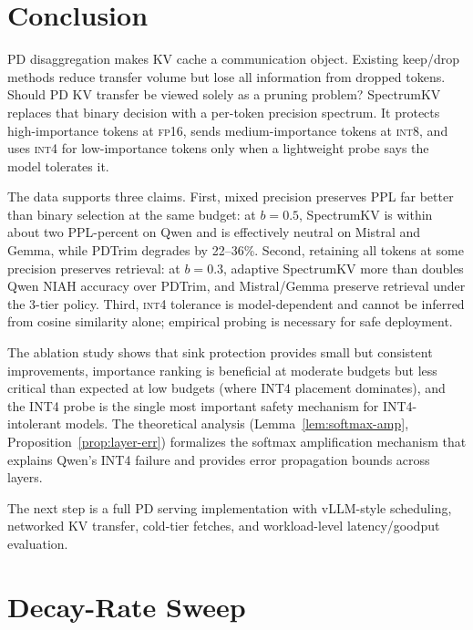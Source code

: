 \documentclass[11pt]{article}
\newcommand{\method}{SpectrumKV}
\newcommand{\niah}{NIAH}
\newcommand{\budget}{b}
\newcommand{\pct}{\%}
\newcommand{\fp}{\textsc{fp16}}
\newcommand{\intviii}{\textsc{int8}}
\newcommand{\intiv}{\textsc{int4}}
\theoremstyle{plain}
\theoremstyle{definition}
\begin{document}
\section{Conclusion}
\label{sec:conclusion}

PD disaggregation makes KV cache a communication object.  Existing keep/drop methods reduce transfer volume but lose all information from dropped tokens.  Should PD KV transfer be viewed solely as a pruning problem?  \method{} replaces that binary decision with a per-token precision spectrum.  It protects high-importance tokens at \fp{}, sends medium-importance tokens at \intviii{}, and uses \intiv{} for low-importance tokens only when a lightweight probe says the model tolerates it.

The data supports three claims.  First, mixed precision preserves PPL far better than binary selection at the same budget: at $\budget=0.5$, \method{} is within about two PPL-percent on Qwen and is effectively neutral on Mistral and Gemma, while PDTrim degrades by 22--36\pct{}.  Second, retaining all tokens at some precision preserves retrieval: at $\budget=0.3$, adaptive \method{} more than doubles Qwen \niah{} accuracy over PDTrim, and Mistral/Gemma preserve retrieval under the 3-tier policy.  Third, \intiv{} tolerance is model-dependent and cannot be inferred from cosine similarity alone; empirical probing is necessary for safe deployment.

The ablation study shows that sink protection provides small but consistent improvements, importance ranking is beneficial at moderate budgets but less critical than expected at low budgets (where INT4 placement dominates), and the INT4 probe is the single most important safety mechanism for INT4-intolerant models.  The theoretical analysis (Lemma~\ref{lem:softmax-amp}, Proposition~\ref{prop:layer-err}) formalizes the softmax amplification mechanism that explains Qwen's INT4 failure and provides error propagation bounds across layers.

The next step is a full PD serving implementation with vLLM-style scheduling, networked KV transfer, cold-tier fetches, and workload-level latency/goodput evaluation.

\appendix

\section{Decay-Rate Sweep}
\label{app:decay}
\end{document}
